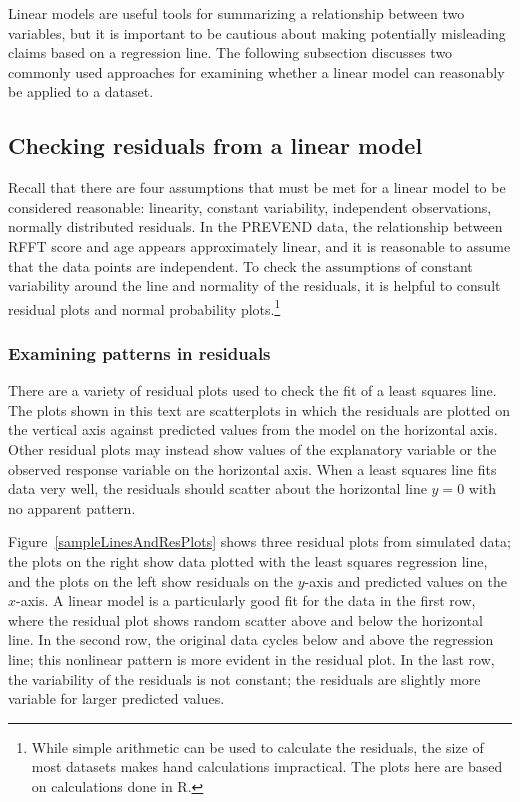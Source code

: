 Linear models are useful tools for summarizing a relationship between two variables, but it is important to be cautious about making potentially misleading claims based on a regression line. The following subsection discusses two commonly used approaches for examining whether a linear model can reasonably be applied to a dataset. 


\subsection{Checking residuals from a linear model}
\label{checkingResiduals}


Recall that there are four assumptions that must be met for a linear model to be considered reasonable: linearity, constant variability, independent observations, normally distributed residuals. In the PREVEND data, the relationship between RFFT score and age appears approximately linear, and it is reasonable to assume that the data points are independent. To check the assumptions of constant variability around the line and normality of the residuals, it is helpful to consult residual plots and normal probability plots.\footnote{While simple arithmetic can be used to calculate the residuals, the size of most datasets makes hand calculations impractical. The plots here are based on calculations done in \textsf{R}.}




\subsubsection{Examining patterns in residuals}

There are a variety of residual plots used to check the fit of a least squares line. The plots shown in this text are scatterplots in which the residuals are plotted on the vertical axis against predicted values from the model on the horizontal axis. Other residual plots may instead show values of the explanatory variable or the observed response variable on the horizontal axis. When a least squares line fits data very well, the residuals should scatter about the horizontal line $y = 0$ with no apparent pattern.

Figure~\ref{sampleLinesAndResPlots} shows three residual plots from simulated data; the plots on the right show data plotted with the least squares regression line, and the plots on the left show residuals on the $y$-axis and predicted values on the $x$-axis. A linear model is a particularly good fit for the data in the first row, where the residual plot shows random scatter above and below the horizontal line. In the second row, the original data cycles below and above the regression line; this nonlinear pattern is more evident in the residual plot. In the last row, the variability of the residuals is not constant; the residuals are slightly more variable for larger predicted values.

